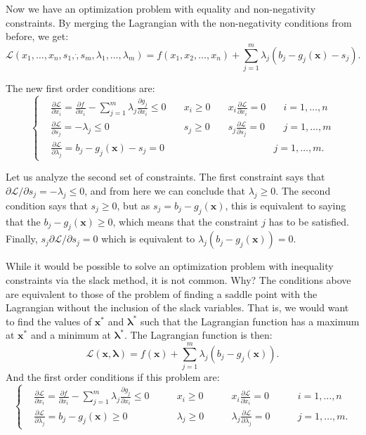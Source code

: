 \documentclass[0pt, a4paper]{article}
\newcommand{\Lagr}{\mathcal{L}}
\begin{document}
Now we have an optimization problem with equality and non-negativity constraints. By merging the Lagrangian with the non-negativity conditions from before, we get:
$$\Lagr(x_1,\dots,x_n,s_1,\dot,s_m,\lambda_1,\dots,\lambda_m)=f(x_1,x_2,\dots,x_n)+\sum_{j=1}^m\lambda_j(b_j-g_j(\textbf{x})-s_j).$$

The new first order conditions are:
\[
\left\{
\begin{aligned}
& \frac{\partial \Lagr}{\partial x_i} =\frac{\partial f}{\partial x_i}-\sum_{j=1}^{m}\lambda_j\frac{\partial g_j}{\partial x_i}\leq0 &\quad x_i\geq0 &\quad x_i\frac{\partial\Lagr}{\partial x_i}=0 &\quad i=1,\dots,n\\
& \frac{\partial \Lagr}{\partial s_j} =-\lambda_j\leq0 &\quad s_j\geq0 &\quad s_j\frac{\partial\Lagr}{\partial s_j}=0 &\quad j=1,\dots,m \\
& \frac{\partial \Lagr}{\partial \lambda_j} =b_j-g_j(\textbf{x})-s_j=0 & & & j=1,\dots,m.
\end{aligned}\right.
\] 

Let us analyze the second set of constraints. The first constraint says that $\partial\Lagr/\partial s_j=-\lambda_j\leq0$, and from here we can conclude that $\lambda_j\geq0$. The second condition says that $s_j\geq0$, but as $s_j=b_j-g_j(\textbf{x})$, this is equivalent to saying that the $b_j-g_j(\textbf{x})\geq0$, which means that the constraint $j$ has to be satisfied. Finally, $s_j\partial\Lagr/\partial s_j=0$ which is equivalent to $\lambda_j(b_j-g_j(\textbf{x}))=0$.

While it would be possible to solve an optimization problem with inequality constraints via the slack method, it is not common. Why? The conditions above are equivalent to those of the problem of finding a saddle point with the Lagrangian without the inclusion of the slack variables. That is, we would want to find the values of $\textbf{x}^*$ and $\boldsymbol{\lambda}^*$ such that the Lagrangian function has a maximum at $\textbf{x}^*$ and a minimum at $\boldsymbol{\lambda}^*$. The Lagrangian function is then:
$$\Lagr(\textbf{x},\boldsymbol{\lambda})=f(\textbf{x})+\sum_{j=1}^{m}\lambda_j(b_j-g_j(\textbf{x})).$$
And the first order conditions if this problem are:
\[
\left\{
\begin{aligned}
& \frac{\partial \Lagr}{\partial x_i} =\frac{\partial f}{\partial x_i}-\sum_{j=1}^{m}\lambda_j\frac{\partial g_j}{\partial x_i}\leq0 \quad &\quad x_i\geq0 \quad&\quad x_i\frac{\partial\Lagr}{\partial x_i}=0 \quad &\quad i=1,\dots,n\\
& \frac{\partial \Lagr}{\partial \lambda_j} =b_j-g_j(\textbf{x})\geq0 \quad&\quad \lambda_j\geq0 \quad&\quad\lambda_j\frac{\partial\Lagr}{\partial \lambda_j}=0   \quad&\quad j=1,\dots,m.
\end{aligned}\right.
\] 
\end{document}
